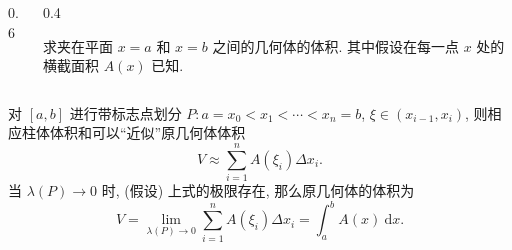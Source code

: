 \begin{frame}
\begin{columns}
\begin{column}{0.6\textwidth}
\begin{tikzpicture}[
scale=1.5,
axis/.style={->, thick, >=latex},
section/.style={fill=blue!10, draw=blue, thick},
hidden/.style={dashed, draw=blue!50}
]
\end{tikzpicture}
\end{column}
\begin{column}{0.4\textwidth}
\begin{question}
求夹在平面 $x=a$ 和 $x=b$ 之间的几何体的体积. 其中假设在每一点 $x$ 处的横截面积 $A(x)$ 已知.
\end{question}
\end{column}
\end{columns}

\pause

对 $[a, b]$ 进行带标志点划分 $P: a = x_0 < x_1 < \cdots < x_n = b$, $\xi \in (x_{i-1}, x_i)$, 则相应柱体体积和可以``近似''原几何体体积
\[
V \approx \sum_{i=1}^n A(\xi_i) \Delta x_i.
\]
当 $\lambda(P) \to 0$ 时, (假设) 上式的极限存在, 那么原几何体的体积为
\[
V = \lim_{\lambda(P) \to 0} \sum_{i=1}^n A(\xi_i) \Delta x_i = \int_a^b A(x) ~ \mathrm{d}x.
\]

\end{frame}


